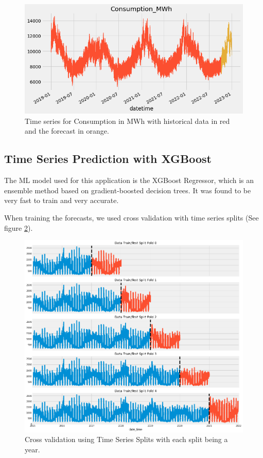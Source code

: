 \documentclass{article}
\begin{document}
\begin{figure}
    \centering
    \includegraphics[width=15cm]{report/images/consumption.png}
    \caption{Time series for Consumption in MWh with historical data in red and the forecast in orange.}
    \label{fig:consumption}
\end{figure}

\subsection{Time Series Prediction with XGBoost}
\label{subsection:xgboost}

The ML model used for this application is the XGBoost Regressor, which is an ensemble method based on gradient-boosted decision trees. It was found to be very fast to train and very accurate.

When training the forecasts, we used cross validation with time series splits (See figure \ref{fig:ts-cross-validation}).

\begin{figure}
    \centering
    \includegraphics[width=15cm]{report/images/ts-cross-validation.png}
    \caption{Cross validation using Time Series Splits with each split being a year.}
    \label{fig:ts-cross-validation}
\end{figure}
\end{document}
